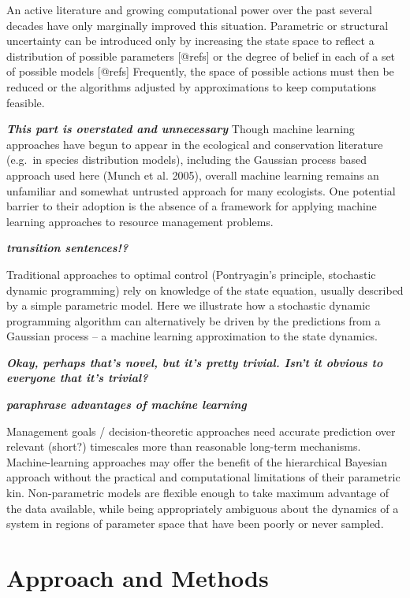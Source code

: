 \documentclass[author-year, review]{elsarticle} %
\begin{document}
An active literature and growing computational power over the past
several decades have only marginally improved this situation. Parametric
or structural uncertainty can be introduced only by increasing the state
space to reflect a distribution of possible parameters {[}@refs{]} or
the degree of belief in each of a set of possible models {[}@refs{]}
Frequently, the space of possible actions must then be reduced or the
algorithms adjusted by approximations to keep computations feasible.

 \textbf{\emph{This part is overstated and unnecessary}} Though machine
learning approaches have begun to appear in the ecological and
conservation literature (e.g.~in species distribution models), including
the Gaussian process based approach used here (Munch et al. 2005),
overall machine learning remains an unfamiliar and somewhat untrusted
approach for many ecologists. One potential barrier to their adoption is
the absence of a framework for applying machine learning approaches to
resource management problems.

\textbf{\emph{transition sentences!?}}

Traditional approaches to optimal control (Pontryagin's principle,
stochastic dynamic programming) rely on knowledge of the state equation,
usually described by a simple parametric model. Here we illustrate how a
stochastic dynamic programming algorithm can alternatively be driven by
the predictions from a Gaussian process -- a machine learning
approximation to the state dynamics.

\textbf{\emph{Okay, perhaps that's novel, but it's pretty trivial. Isn't
it obvious to everyone that it's trivial?}}

\textbf{\emph{paraphrase advantages of machine learning}}

Management goals / decision-theoretic approaches need accurate
prediction over relevant (short?) timescales more than reasonable
long-term mechanisms. Machine-learning approaches may offer the benefit
of the hierarchical Bayesian approach without the practical and
computational limitations of their parametric kin. Non-parametric models
are flexible enough to take maximum advantage of the data available,
while being appropriately ambiguous about the dynamics of a system in
regions of parameter space that have been poorly or never sampled.

\section{Approach and Methods}
\end{document}

